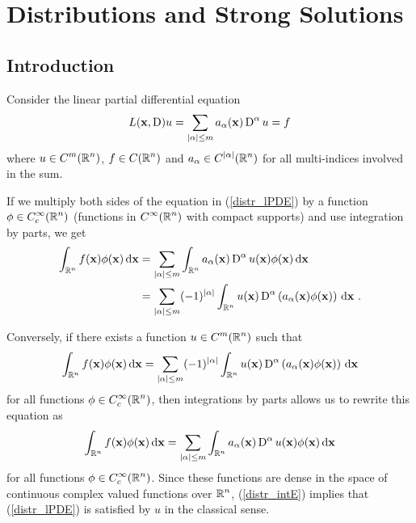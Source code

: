 \chapter{Distributions and Strong Solutions}
\label{ChapterDistributions}

\section{Introduction}

Consider the linear partial differential equation
\begin{equation} \label{distr_lPDE}
L(\mathbf{x}, \operatorname{D})u = \sum_{|\alpha|\leq m} a_\alpha(\mathbf{x}) \operatorname{D}^\alpha u = f
\end{equation}
where $\displaystyle u \in C^m(\mathbb{R}^n)$, $\displaystyle f \in C(\mathbb{R}^n)$
and $\displaystyle a_\alpha \in C^{|\alpha|}(\mathbb{R}^n)$ for all
multi-indices involved in the sum.

If we multiply both sides of the equation in (\ref{distr_lPDE}) by a
function $\displaystyle \phi \in C_c^\infty(\mathbb{R}^n)$
(functions in $\displaystyle C^\infty(\mathbb{R}^n)$ with compact supports) and
use integration by parts, we get
\begin{align*}
\int_{\mathbb{R}^n} f(\mathbf{x})\phi(\mathbf{x}) \,\mathrm{d}{\mathbf{x}}
&= \sum_{|\alpha|\leq m} \int_{\mathbb{R}^n} a_\alpha(\mathbf{x})
\operatorname{D}^\alpha u(\mathbf{x})\phi(\mathbf{x}) \,\mathrm{d}{\mathbf{x}} \\
&= \sum_{|\alpha|\leq m} (-1)^{|\alpha|}\int_{\mathbb{R}^n}
u(\mathbf{x}) \operatorname{D}^\alpha \left(a_\alpha(\mathbf{x})\phi(\mathbf{x})\right)
\,\mathrm{d}{\mathbf{x}} \ .
\end{align*}

Conversely, if there exists a function $\displaystyle u \in C^m(\mathbb{R}^n)$
such that
\begin{equation} \label{distr_intE}
\int_{\mathbb{R}^n} f(\mathbf{x})\phi(\mathbf{x}) \,\mathrm{d}{\mathbf{x}}
= \sum_{|\alpha|\leq m} (-1)^{|\alpha|}\int_{\mathbb{R}^n}
u(\mathbf{x}) \operatorname{D}^\alpha \left(a_\alpha(\mathbf{x})\phi(\mathbf{x})\right) \,\mathrm{d}{\mathbf{x}}
\end{equation}
for all functions $\displaystyle \phi \in C_c^\infty(\mathbb{R}^n)$,
then integrations by parts allows us to rewrite this equation as
\[
\int_{\mathbb{R}^n} f(\mathbf{x})\phi(\mathbf{x}) \,\mathrm{d}{\mathbf{x}}
= \sum_{|\alpha|\leq m} \int_{\mathbb{R}^n} a_\alpha(\mathbf{x})
\operatorname{D}^\alpha u(\mathbf{x})\phi(\mathbf{x}) \,\mathrm{d}{\mathbf{x}}
\]
for all functions $\displaystyle \phi \in C_c^\infty(\mathbb{R}^n)$.
Since these functions are dense in the space of continuous complex valued
functions over $\displaystyle \mathbb{R}^n$, (\ref{distr_intE}) implies that
(\ref{distr_lPDE}) is satisfied by $u$ in the classical sense.

